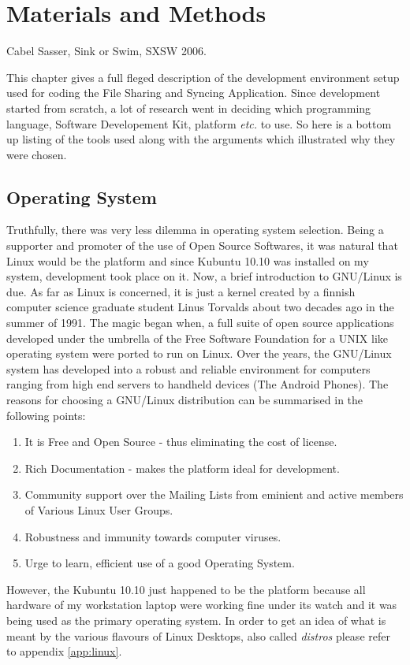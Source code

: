 \chapter{Materials and Methods}
\label{chap:devTools}
\begin{epigraphs}
%
      {Cabel Sasser, Sink or Swim, SXSW 2006}.
\end{epigraphs}
This chapter gives a full fleged description of the development environment setup used for coding the File Sharing and Syncing Application. Since development started from scratch, a lot of research went in deciding which programming language, Software Developement Kit, platform \emph{etc.} to use. So here is a bottom up listing of the tools used along with the arguments which illustrated why they were chosen.

\section {Operating System}
Truthfully, there was very less dilemma in operating system selection. Being a supporter and promoter of the use of Open Source Softwares, it was natural that Linux would be the platform and since Kubuntu 10.10 was installed on my system, development took place on it. Now, a brief introduction to GNU/Linux is due. As far as Linux is concerned, it is just a kernel created by a finnish computer science graduate student Linus Torvalds about two decades ago in the summer of 1991. The magic began when, a full suite of open source applications developed under the umbrella of the Free Software Foundation for a UNIX like operating system were ported to run on Linux. Over the years, the GNU/Linux system has developed into a robust and reliable environment for computers ranging from high end servers to handheld devices (The Android Phones).
The reasons for choosing a GNU/Linux distribution can be summarised in the following points:
\begin{enumerate}
  \item It is Free and Open Source - thus eliminating the cost of license.
  \item Rich Documentation - makes the platform ideal for development.
  \item Community support over the Mailing Lists from eminient and active members of Various Linux User Groups.
  \item Robustness and immunity towards computer viruses.
  \item Urge to learn, efficient use of a good Operating System.
\end{enumerate}
However, the Kubuntu 10.10 just happened to be the platform because all hardware of my workstation laptop were working fine under its watch and it was being used as the primary operating system. In order to get an idea of what is meant by the various flavours of Linux Desktops, also called \emph{distros} please refer to appendix \ref{app:linux}.


